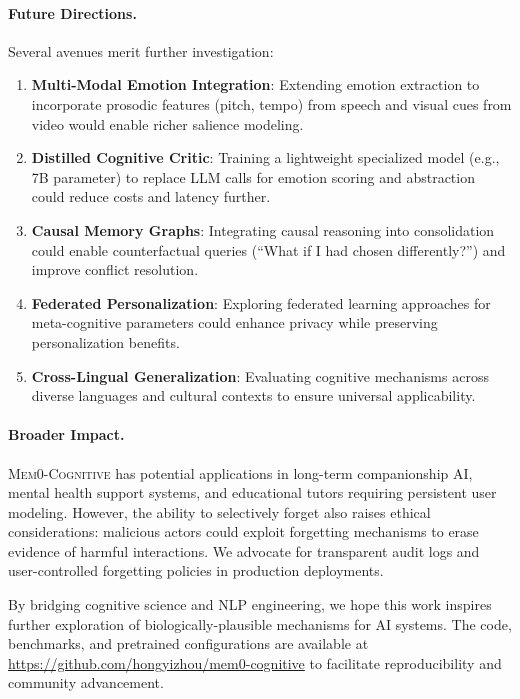 \paragraph{Future Directions.} Several avenues merit further investigation:
\begin{enumerate}
    \item \textbf{Multi-Modal Emotion Integration}: Extending emotion extraction to incorporate prosodic features (pitch, tempo) from speech and visual cues from video would enable richer salience modeling.
    \item \textbf{Distilled Cognitive Critic}: Training a lightweight specialized model (e.g., 7B parameter) to replace LLM calls for emotion scoring and abstraction could reduce costs and latency further.
    \item \textbf{Causal Memory Graphs}: Integrating causal reasoning into consolidation could enable counterfactual queries (``What if I had chosen differently?'') and improve conflict resolution.
    \item \textbf{Federated Personalization}: Exploring federated learning approaches for meta-cognitive parameters could enhance privacy while preserving personalization benefits.
    \item \textbf{Cross-Lingual Generalization}: Evaluating cognitive mechanisms across diverse languages and cultural contexts to ensure universal applicability.
\end{enumerate}

\paragraph{Broader Impact.} \textsc{Mem0-Cognitive} has potential applications in long-term companionship AI, mental health support systems, and educational tutors requiring persistent user modeling. However, the ability to selectively forget also raises ethical considerations: malicious actors could exploit forgetting mechanisms to erase evidence of harmful interactions. We advocate for transparent audit logs and user-controlled forgetting policies in production deployments.

By bridging cognitive science and NLP engineering, we hope this work inspires further exploration of biologically-plausible mechanisms for AI systems. The code, benchmarks, and pretrained configurations are available at \url{https://github.com/hongyizhou/mem0-cognitive} to facilitate reproducibility and community advancement.
